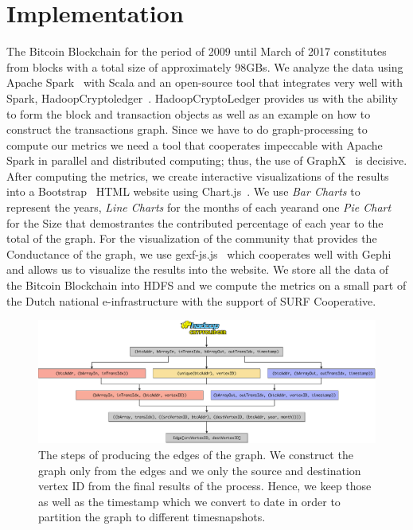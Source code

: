 \section{Implementation}
\label{sec:implementation}

The Bitcoin Blockchain for the period of 2009 until March of 2017 constitutes
from blocks with a total size of approximately 98GBs. We analyze the data using
Apache Spark~\cite{Zaharia} with Scala and an open-source tool that integrates
very well with Spark, HadoopCryptoledger~\cite{cryptoledger}. HadoopCryptoLedger 
provides us with the ability to form the block and transaction objects as well as 
an example on how to construct the transactions graph. Since we have to do graph-processing
to compute our metrics we need a tool that cooperates impeccable with Apache
Spark in parallel and distributed computing; thus, the use of
GraphX~\cite{graphx} is decisive. After computing the metrics, we create
interactive visualizations of the results into a Bootstrap~\cite{bootstrap}
HTML website using Chart.js~\cite{chartjs}. We use \textit{Bar Charts} to represent the years, \textit{Line Charts} for the months of each yearand one \textit{Pie Chart} for the Size that demostrantes the contributed percentage of 
each year to the total of the graph. For the visualization of the
community that provides the Conductance of the graph, we use gexf-js.js~\cite{gexfjs}
which cooperates well with Gephi~\cite{gephi} and allows us to visualize the results into the website. 
We store all the data of the Bitcoin Blockchain into HDFS and we compute the metrics on a small part of the Dutch
national e-infrastructure with the support of SURF Cooperative.

\begin{figure}[h!]
	\centering
	\includegraphics[width=1\linewidth]{./images/fig2}
	\caption{The steps of producing the edges of the graph. We construct the graph only from the edges and we only the source and destination vertex ID from the final results of the process. Hence, we keep those as well as the timestamp which we convert to date in order to partition the graph to different timesnapshots.}
	\label{fig:fig2}
\end{figure}

